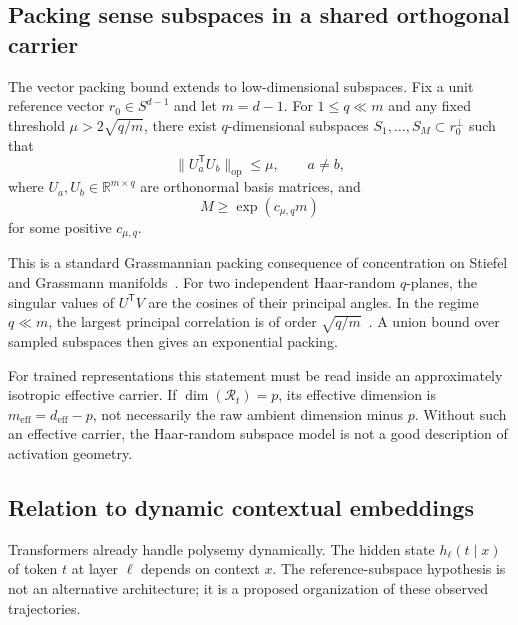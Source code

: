 \documentclass[
  aps,
  reprint,
  superscriptaddress,
  floatfix,
  nofootinbib,
  longbibliography
]{revtex4-2}
\newcommand{\R}{\mathbb{R}}
\newcommand{\Sph}[1]{S^{#1}}
\newcommand{\deff}{d_{\mathrm{eff}}}
\newcommand{\meff}{m_{\mathrm{eff}}}
\newcommand{\T}{^{\mathsf{T}}}
\newcommand{\opnorm}[1]{\lVert #1 \rVert_{\mathrm{op}}}
\begin{document}
\subsection{Packing sense subspaces in a shared orthogonal carrier}
\label{sec:grassmann}

The vector packing bound extends to low-dimensional subspaces. Fix a unit
reference vector $r_0\in\Sph{d-1}$ and let $m=d-1$. For $1\le q\ll m$ and
any fixed threshold $\mu>2\sqrt{q/m}$, there exist $q$-dimensional
subspaces $S_1,\dots,S_M\subset r_0^\perp$ such that
%
\begin{equation}
\label{eq:grassmann-coherence}
\opnorm{U_a\T U_b}\le \mu,\qquad a\neq b,
\end{equation}
%
where $U_a,U_b\in\R^{m\times q}$ are orthonormal basis matrices, and
%
\begin{equation}
\label{eq:grassmann-count}
M\ge \exp(c_{\mu,q}m)
\end{equation}
%
for some positive $c_{\mu,q}$.

This is a standard Grassmannian packing consequence of concentration on
Stiefel and Grassmann manifolds~\cite{szarek1982nets,conway1996packings}.
For two independent Haar-random $q$-planes, the singular values of $U\T V$
are the cosines of their principal angles. In the regime $q\ll m$, the
largest principal correlation is of order
$\sqrt{q/m}$~\cite{chikuse2003statistics,absil2006condition,edelman1998random}.
A union bound over sampled subspaces then gives an exponential packing.

For trained representations this statement must be read inside an
approximately isotropic effective carrier. If
$\dim(\mathcal R_t)=p$, its effective dimension is
$\meff=\deff-p$, not necessarily the raw ambient dimension minus $p$.
Without such an effective carrier, the Haar-random subspace model is not a
good description of activation geometry.

\subsection{Relation to dynamic contextual embeddings}
\label{sec:dynamic}

Transformers already handle polysemy dynamically. The hidden state
$h_\ell(t\mid x)$ of token $t$ at layer $\ell$ depends on context $x$.
The reference-subspace hypothesis is not an alternative architecture; it is
a proposed organization of these observed trajectories.
\end{document}
